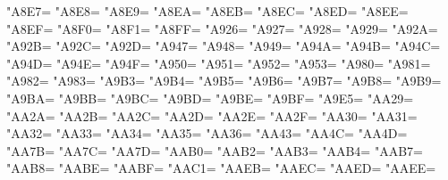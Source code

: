 \XeTeXcharclass"A8E7=\KclassCM
\XeTeXcharclass"A8E8=\KclassCM
\XeTeXcharclass"A8E9=\KclassCM
\XeTeXcharclass"A8EA=\KclassCM
\XeTeXcharclass"A8EB=\KclassCM
\XeTeXcharclass"A8EC=\KclassCM
\XeTeXcharclass"A8ED=\KclassCM
\XeTeXcharclass"A8EE=\KclassCM
\XeTeXcharclass"A8EF=\KclassCM
\XeTeXcharclass"A8F0=\KclassCM
\XeTeXcharclass"A8F1=\KclassCM
\XeTeXcharclass"A8FF=\KclassCM
\XeTeXcharclass"A926=\KclassCM
\XeTeXcharclass"A927=\KclassCM
\XeTeXcharclass"A928=\KclassCM
\XeTeXcharclass"A929=\KclassCM
\XeTeXcharclass"A92A=\KclassCM
\XeTeXcharclass"A92B=\KclassCM
\XeTeXcharclass"A92C=\KclassCM
\XeTeXcharclass"A92D=\KclassCM
\XeTeXcharclass"A947=\KclassCM
\XeTeXcharclass"A948=\KclassCM
\XeTeXcharclass"A949=\KclassCM
\XeTeXcharclass"A94A=\KclassCM
\XeTeXcharclass"A94B=\KclassCM
\XeTeXcharclass"A94C=\KclassCM
\XeTeXcharclass"A94D=\KclassCM
\XeTeXcharclass"A94E=\KclassCM
\XeTeXcharclass"A94F=\KclassCM
\XeTeXcharclass"A950=\KclassCM
\XeTeXcharclass"A951=\KclassCM
\XeTeXcharclass"A952=\KclassCM
\XeTeXcharclass"A953=\KclassCM
\XeTeXcharclass"A980=\KclassCM
\XeTeXcharclass"A981=\KclassCM
\XeTeXcharclass"A982=\KclassCM
\XeTeXcharclass"A983=\KclassCM
\XeTeXcharclass"A9B3=\KclassCM
\XeTeXcharclass"A9B4=\KclassCM
\XeTeXcharclass"A9B5=\KclassCM
\XeTeXcharclass"A9B6=\KclassCM
\XeTeXcharclass"A9B7=\KclassCM
\XeTeXcharclass"A9B8=\KclassCM
\XeTeXcharclass"A9B9=\KclassCM
\XeTeXcharclass"A9BA=\KclassCM
\XeTeXcharclass"A9BB=\KclassCM
\XeTeXcharclass"A9BC=\KclassCM
\XeTeXcharclass"A9BD=\KclassCM
\XeTeXcharclass"A9BE=\KclassCM
\XeTeXcharclass"A9BF=\KclassCM
\XeTeXcharclass"A9E5=\KclassCM
\XeTeXcharclass"AA29=\KclassCM
\XeTeXcharclass"AA2A=\KclassCM
\XeTeXcharclass"AA2B=\KclassCM
\XeTeXcharclass"AA2C=\KclassCM
\XeTeXcharclass"AA2D=\KclassCM
\XeTeXcharclass"AA2E=\KclassCM
\XeTeXcharclass"AA2F=\KclassCM
\XeTeXcharclass"AA30=\KclassCM
\XeTeXcharclass"AA31=\KclassCM
\XeTeXcharclass"AA32=\KclassCM
\XeTeXcharclass"AA33=\KclassCM
\XeTeXcharclass"AA34=\KclassCM
\XeTeXcharclass"AA35=\KclassCM
\XeTeXcharclass"AA36=\KclassCM
\XeTeXcharclass"AA43=\KclassCM
\XeTeXcharclass"AA4C=\KclassCM
\XeTeXcharclass"AA4D=\KclassCM
\XeTeXcharclass"AA7B=\KclassCM
\XeTeXcharclass"AA7C=\KclassCM
\XeTeXcharclass"AA7D=\KclassCM
\XeTeXcharclass"AAB0=\KclassCM
\XeTeXcharclass"AAB2=\KclassCM
\XeTeXcharclass"AAB3=\KclassCM
\XeTeXcharclass"AAB4=\KclassCM
\XeTeXcharclass"AAB7=\KclassCM
\XeTeXcharclass"AAB8=\KclassCM
\XeTeXcharclass"AABE=\KclassCM
\XeTeXcharclass"AABF=\KclassCM
\XeTeXcharclass"AAC1=\KclassCM
\XeTeXcharclass"AAEB=\KclassCM
\XeTeXcharclass"AAEC=\KclassCM
\XeTeXcharclass"AAED=\KclassCM
\XeTeXcharclass"AAEE=\KclassCM
